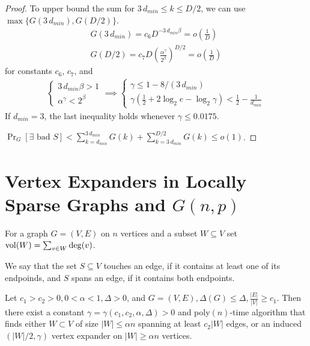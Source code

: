 \begin{proof}
    To upper bound the sum for $3\,d_{min}\leq k\leq D/2$,
    we can use $\max\{G(3\,d_{min}),G(D/2)\}$.
    \begin{gather}
        G(3\,d_{min})=c_6D^{-3\,d_{min}\beta}=o\left(\frac{1}{D}\right)\\
        G(D/2)=c_7D\left(\frac{\alpha^\gamma}{2^\beta}\right)^{D/2}=o\left(\frac{1}{D}\right)
    \end{gather}
    for constants $c_6$, $c_7$, and
    \begin{gather}
        \begin{cases}
            3\,d_{min}\beta>1\\
            \alpha^\gamma<2^\beta
        \end{cases}\implies
        \begin{cases}
            \gamma\leq1-8/(3\,d_{min})\\
            \gamma(\frac{1}{2}+2\log_2{e}-\log_2{\gamma})<\frac{1}{2}-\frac{1}{d_{min}}
        \end{cases}
    \end{gather}
    If $d_{min}=3$, the last inequality holds whenever $\gamma\leq 0.0175$.
    
    $\Pr_G[\exists\text{ bad }S]<\sum_{k=d_{min}}^{3\,d_{min}}{G(k)}
    +\sum_{k=3\,d_{min}}^{D/2}{G(k)}\leq o(1)$.
\end{proof}

\section{Vertex Expanders in Locally Sparse Graphs and \texorpdfstring{$G(n,p)$}{G(n,p)}}

For a graph $G=(V,E)$ on $n$ vertices and a subset $W\subseteq V$ set $\operatorname*{vol}(W)=\sum_{v\in W}\deg(v)$.

We say that the set $S\subseteq V$ touches an edge, if it contains at least one of its endpoinds,
and $S$ spans an edge, if it contains both endpoints.

\begin{theorem}
    \label{thm:kri}
    Let $c_1>c_2>0, 0<\alpha<1, \Delta>0$, and
    $G=(V,E), \Delta(G)\leq\Delta,\frac{|E|}{|V|}\geq c_1$.
    Then there exist a constant $\gamma=\gamma(c_1,c_2,\alpha,\Delta)>0$
    and poly$(n)$-time algorithm that finds
    either $W\subset V$ of size $|W|\leq\alpha n$ spanning at least $c_2|W|$ edges,
    or an induced $(|W|/2,\gamma)$ vertex expander on $|W|\geq\alpha n$ vertices.
\end{theorem}


